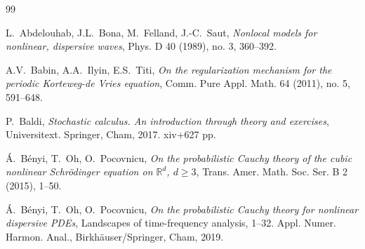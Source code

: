 \documentclass[letterpaper, 11pt,  reqno]{amsart}
\newcommand{\1}{\hspace{0.5mm}\text{I}\hspace{0.5mm}}
\newcommand{\R}{\mathbb{R}}
\numberwithin{equation}{section}
\numberwithin{theorem}{section}
\begin{document}
\begin{thebibliography}{99}


 L.~Abdelouhab, J.L.~Bona, M.~Felland, J.-C.~Saut,
{\it Nonlocal models for nonlinear, dispersive waves}, 
Phys. D 40 (1989), no. 3, 360--392.


%
%




A.V.~Babin, A.A.~Ilyin, E.S.~Titi,
{\it On the regularization mechanism for the periodic Korteweg-de Vries equation}, 
Comm. Pure Appl. Math. 64 (2011), no. 5, 591--648.


P.~Baldi, 
{\it Stochastic calculus. An introduction through theory and exercises},
 Universitext. Springer, Cham, 2017. xiv+627 pp.



%


%
%
%




%
%
%



\'A.~B\'enyi, T.~Oh, O.~Pocovnicu,
{\it On the probabilistic Cauchy theory of the cubic nonlinear Schr\"odinger equation on $\R^d$, $d\ge 3$}, 
Trans. Amer. Math. Soc. Ser. B 2 (2015), 1--50. 



\'A.~B\'enyi, T.~Oh, O.~Pocovnicu,
{\it  On the probabilistic Cauchy theory for nonlinear dispersive PDEs}, 
Landscapes of time-frequency analysis, 1--32. 
Appl. Numer. Harmon. Anal., 
Birkh\"auser/Springer, Cham, 2019.



%
%
%






\end{thebibliography}
\end{document}

